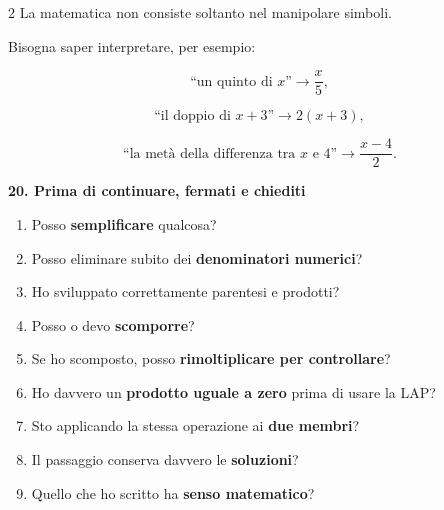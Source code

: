 \documentclass[9pt,a4paper]{extarticle}
\newcommand{\voce}[1]{%
	\vspace{3pt}
	{\color{titolo}\textbf{#1}}\par
	\vspace{1pt}
}
\begin{document}
\begin{multicols}{2}
La matematica non consiste soltanto nel manipolare simboli.

Bisogna saper interpretare, per esempio:

\[
\text{``un quinto di }x\text{''}
\longrightarrow
\frac{x}{5},
\]

\[
\text{``il doppio di }x+3\text{''}
\longrightarrow
2(x+3),
\]

\[
\text{``la metà della differenza tra }x\text{ e }4\text{''}
\longrightarrow
\frac{x-4}{2}.
\]

\voce{20. Prima di continuare, fermati e chiediti}

\begin{enumerate}[
	leftmargin=*,
	itemsep=0.5pt,
	topsep=1pt,
	parsep=0pt
]
	\item Posso \textbf{semplificare} qualcosa?
	\item Posso eliminare subito dei \textbf{denominatori numerici}?
	\item Ho sviluppato correttamente parentesi e prodotti?
	\item Posso o devo \textbf{scomporre}?
	\item Se ho scomposto, posso \textbf{rimoltiplicare per controllare}?
	\item Ho davvero un \textbf{prodotto uguale a zero} prima di usare la LAP?
	\item Sto applicando la stessa operazione ai \textbf{due membri}?
	\item Il passaggio conserva davvero le \textbf{soluzioni}?
	\item Quello che ho scritto ha \textbf{senso matematico}?
\end{enumerate}

\vspace{2mm}

\begin{center}
\end{center}

\end{multicols}
\end{document}

